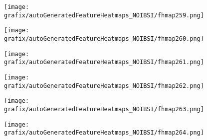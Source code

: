 \hspace{\hsp} 
\begin{subfigure}{\wid\textwidth} 
    \centering 
    \caption{\tiny \sffamily {}} 
    \vspace{\vsp} 
    \texttt{[image: grafix/autoGeneratedFeatureHeatmaps\_NOIBSI/fhmap259.png]} 
\end{subfigure} 
\hspace{\hsp} 
\begin{subfigure}{\wid\textwidth} 
    \centering 
    \caption{\tiny \sffamily {}} 
    \vspace{\vsp} 
    \texttt{[image: grafix/autoGeneratedFeatureHeatmaps\_NOIBSI/fhmap260.png]} 
\end{subfigure} 
\hspace{\hsp} 
\begin{subfigure}{\wid\textwidth} 
    \centering 
    \caption{\tiny \sffamily {}} 
    \vspace{\vsp} 
    \texttt{[image: grafix/autoGeneratedFeatureHeatmaps\_NOIBSI/fhmap261.png]} 
\end{subfigure} 
\hspace{\hsp} 
\begin{subfigure}{\wid\textwidth} 
    \centering 
    \caption{\tiny \sffamily {}} 
    \vspace{\vsp} 
    \texttt{[image: grafix/autoGeneratedFeatureHeatmaps\_NOIBSI/fhmap262.png]} 
\end{subfigure} 
\hspace{\hsp} 
\begin{subfigure}{\wid\textwidth} 
    \centering 
    \caption{\tiny \sffamily {}} 
    \vspace{\vsp} 
    \texttt{[image: grafix/autoGeneratedFeatureHeatmaps\_NOIBSI/fhmap263.png]} 
\end{subfigure} 
\hspace{\hsp} 
\begin{subfigure}{\wid\textwidth} 
    \centering 
    \caption{\tiny \sffamily {}} 
    \vspace{\vsp} 
    \texttt{[image: grafix/autoGeneratedFeatureHeatmaps\_NOIBSI/fhmap264.png]} 
\end{subfigure} 
\hspace{\hsp} 
